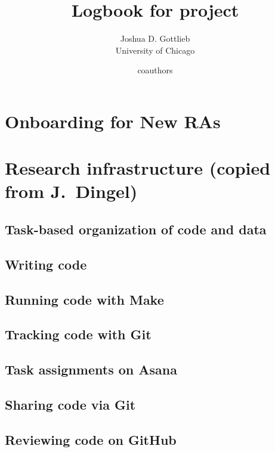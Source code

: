 \documentclass{report}
\title{Logbook for project}
\author{
Joshua D. Gottlieb \\ {University of Chicago} \and
coauthors
}
\date{}
\numberwithin{equation}{section}
\numberwithin{figure}{section}
\numberwithin{table}{section}
\begin{document}
\maketitle

\renewcommand{\thechapter}{\Alph{chapter}}
\setcounter{tocdepth}{1}
\tableofcontents
\etocsettocstyle{}{} %

\chapter{Onboarding for New RAs}

\chapter{Research infrastructure (copied from J.~Dingel)}


\section{Task-based organization of code and data} 
\section{Writing code} 
\section{Running code with Make} 
\section{Tracking code with Git} 

\section{Task assignments on Asana} 
\section{Sharing code via Git} 
\section{Reviewing code on GitHub} 
\end{document}
